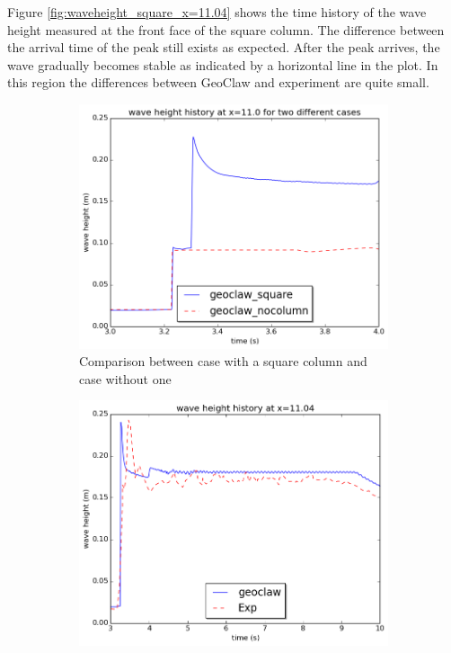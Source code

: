 \documentclass[11pt]{article}
\begin{document}
\par
Figure \ref{fig:waveheight_square_x=11.04} shows the time history of the wave height measured at the front face of the square column. 
The difference between the arrival time of the peak still exists as expected. After the peak arrives, the wave gradually becomes stable as indicated by a horizontal line in the plot. In this region the differences between GeoClaw and experiment are quite small. 
\begin{figure}[h!]
    \centering
    \begin{subfigure}[b]{0.4\textwidth}
        \includegraphics[width=1\textwidth]{./plots/waveheight_x11_comparison}
        \caption{Comparison between case with a square column and case without one}
        \label{fig:waveheight_x11_comparison}
    \end{subfigure}
    \begin{subfigure}[b]{0.4\textwidth}
        \includegraphics[width=1\textwidth]{./plots/waveheight_square_x1104_largerTimeRange}

\end{subfigure}
\end{figure}
\end{document}
